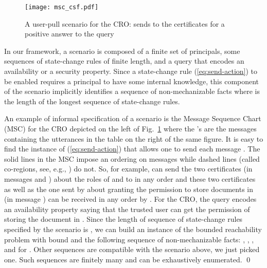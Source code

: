 \documentclass[conference]{llncs}
\newcommand{\CRO}{CRO}
\begin{document}
\begin{figure}[t]
  \centering
  \texttt{[image: msc\_csf.pdf]} 
  \quad\quad\quad
  \caption{\label{fig:msc-cro}A user-pull scenario for the \CRO{}:
     sends to  the certificates for a positive answer to
    the query  }
\end{figure}


In our framework, a scenario is composed of a finite set of principals,
some sequences of state-change rules of finite length, and a query 
that encodes an availability or a security property. Since a
state-change rule (\ref{eq:send-action}) to be enabled requires a
principal to have some internal knowledge, this component of the
scenario implicitly identifies a sequence  of non-mechanizable facts where  is
the length of the longest sequence of state-change rules. 

\begin{example}
An example of informal specification of a scenario is the Message Sequence Chart (MSC)
for the \CRO{} depicted on the left of Fig.~\ref{fig:msc-cro} where the
's are the messages containing the utterances in the table on the
right of the same figure. It is easy to find the instance of
(\ref{eq:send-action}) that allows one to send each message . The
solid lines in the MSC impose an ordering on messages while dashed lines
(called co-regions, see, e.g., \cite{rudolph96}) do not. So, for
example,  can send the two certificates (in messages  and
) about the roles of  and  to  in any order and
these two certificates as well as the one sent by  about
granting the permission to store documents in  (in message )
can be received in any order by . For the \CRO{}, the query
 encodes an availability
property saying that the trusted user  can get the permission of
storing the document in . Since the length of sequence of
state-change rules specified by the scenario is , we can build an
instance of the bounded reachability problem with bound  and the
following sequence of non-mechanizable facts: , , , and  for .
Other sequences are compatible with the scenario above, we just picked
one. Such sequences are finitely many and can be exhaustively enumerated.
\qed
\end{example}
\end{document}
